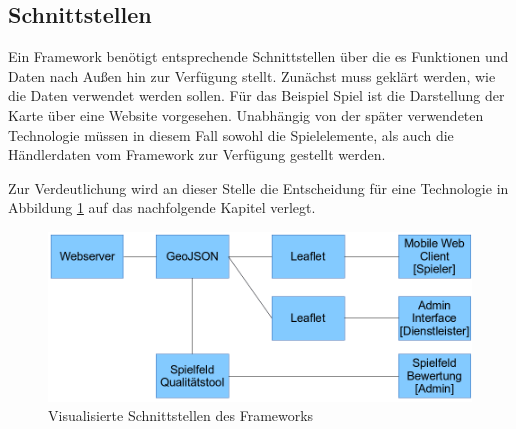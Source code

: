 \subsection*{Schnittstellen}

Ein Framework benötigt entsprechende Schnittstellen über die es Funktionen und Daten nach Außen hin zur Verfügung stellt. Zunächst muss geklärt werden, wie die Daten verwendet werden sollen. Für das Beispiel Spiel ist die Darstellung der Karte über eine Website vorgesehen. Unabhängig von der später verwendeten Technologie müssen in diesem Fall sowohl die Spielelemente, als auch die Händlerdaten vom Framework zur Verfügung gestellt werden.

Zur Verdeutlichung wird an dieser Stelle die Entscheidung für eine Technologie in Abbildung \ref{img:ch5_img04_interfaces} auf das nachfolgende Kapitel verlegt.

\begin{figure}[H]
\begin{center}
\includegraphics[width=140mm]{images/ch5_img04_interfaces.png}
\caption{Visualisierte Schnittstellen des Frameworks}
\label{img:ch5_img04_interfaces}
\end{center}
\end{figure}

